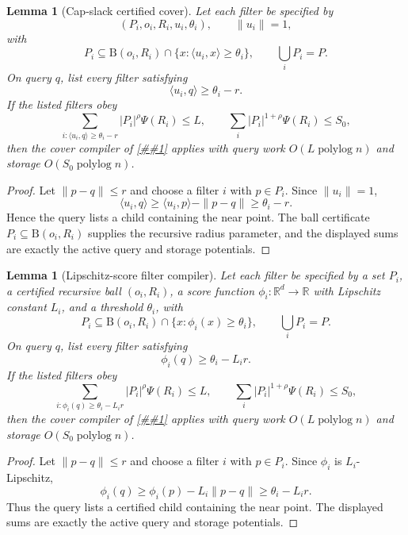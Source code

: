 \documentclass[10pt]{article}
\newcommand{\cref}[1]{\ref{##1}}
\newtheorem{lemma}[theorem]{Lemma}
\theoremstyle{definition}
\newcommand{\R}{\mathbb{R}}
\newcommand{\Ball}{\mathrm{B}}
\newcommand{\polylog}{\operatorname{polylog}}
\begin{document}
\begin{lemma}[Cap-slack certified cover]\label{lem:cap-slack-cover}
   Let each filter be specified by
   \[
      (P_i,o_i,R_i,u_i,\theta_i),
      \qquad \|u_i\|=1,
   \]
   with
   \[
      P_i\subseteq \Ball(o_i,R_i)
      \cap \{x:\langle u_i,x\rangle\ge \theta_i\},
      \qquad \bigcup_iP_i=P .
   \]
   On query $q$, list every filter satisfying
   \[
      \langle u_i,q\rangle\ge \theta_i-r .
   \]
   If the listed filters obey
   \[
      \sum_{i:\langle u_i,q\rangle\ge\theta_i-r}
      |P_i|^\rho\Psi(R_i)\le L,
      \qquad
      \sum_i |P_i|^{1+\rho}\Psi(R_i)\le S_0,
   \]
   then the cover compiler of \cref{lem:certified-cover-compiler} applies with
   query work $O(L\polylog n)$ and storage $O(S_0\polylog n)$.
\end{lemma}

\begin{proof}
   Let $\|p-q\|\le r$ and choose a filter $i$ with $p\in P_i$.  Since
   $\|u_i\|=1$,
   \[
      \langle u_i,q\rangle
      \ge
      \langle u_i,p\rangle-\|p-q\|
      \ge
      \theta_i-r .
   \]
   Hence the query lists a child containing the near point.  The ball
   certificate $P_i\subseteq\Ball(o_i,R_i)$ supplies the recursive radius
   parameter, and the displayed sums are exactly the active query and storage
   potentials.
\end{proof}

\begin{lemma}[Lipschitz-score filter compiler]\label{lem:lipschitz-score-cover}
   Let each filter be specified by a set $P_i$, a certified recursive ball
   $(o_i,R_i)$, a score function $\phi_i:\R^d\to\R$ with Lipschitz constant
   $L_i$, and a threshold $\theta_i$, with
   \[
      P_i\subseteq\Ball(o_i,R_i)\cap\{x:\phi_i(x)\ge\theta_i\},
      \qquad
      \bigcup_iP_i=P .
   \]
   On query $q$, list every filter satisfying
   \[
      \phi_i(q)\ge \theta_i-L_i r .
   \]
   If the listed filters obey
   \[
      \sum_{i:\phi_i(q)\ge\theta_i-L_i r}
      |P_i|^\rho\Psi(R_i)\le L,
      \qquad
      \sum_i |P_i|^{1+\rho}\Psi(R_i)\le S_0,
   \]
   then the cover compiler of \cref{lem:certified-cover-compiler} applies with
   query work $O(L\polylog n)$ and storage $O(S_0\polylog n)$.
\end{lemma}

\begin{proof}
   Let $\|p-q\|\le r$ and choose a filter $i$ with $p\in P_i$.  Since
   $\phi_i$ is $L_i$-Lipschitz,
   \[
      \phi_i(q)\ge\phi_i(p)-L_i\|p-q\|\ge\theta_i-L_i r .
   \]
   Thus the query lists a certified child containing the near point.  The
   displayed sums are exactly the active query and storage potentials.
\end{proof}
\end{document}
